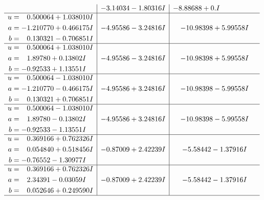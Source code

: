 \documentclass[1p]{elsarticle_modified}
\theoremstyle{definition}
\begin{document}
$$\begin{array}{c|c|c}
 & -3.14034 - 1.80316 I & -8.88688 + 0. I\phantom{ +0.000000I} \\ \hline\begin{aligned}
u &= \phantom{-}0.500064 + 1.038010 I \\
a &= -1.210770 + 0.466175 I \\
b &= \phantom{-}0.130321 - 0.706851 I\end{aligned}
 & -4.95586 - 3.24816 I & -10.98398 + 5.99558 I \\ \hline\begin{aligned}
u &= \phantom{-}0.500064 + 1.038010 I \\
a &= \phantom{-}1.89780 + 0.13802 I \\
b &= -0.92533 + 1.13551 I\end{aligned}
 & -4.95586 - 3.24816 I & -10.98398 + 5.99558 I \\ \hline\begin{aligned}
u &= \phantom{-}0.500064 - 1.038010 I \\
a &= -1.210770 - 0.466175 I \\
b &= \phantom{-}0.130321 + 0.706851 I\end{aligned}
 & -4.95586 + 3.24816 I & -10.98398 - 5.99558 I \\ \hline\begin{aligned}
u &= \phantom{-}0.500064 - 1.038010 I \\
a &= \phantom{-}1.89780 - 0.13802 I \\
b &= -0.92533 - 1.13551 I\end{aligned}
 & -4.95586 + 3.24816 I & -10.98398 - 5.99558 I \\ \hline\begin{aligned}
u &= \phantom{-}0.369166 + 0.762326 I \\
a &= \phantom{-}0.054840 + 0.518456 I \\
b &= -0.76552 - 1.30977 I\end{aligned}
 & -0.87009 + 2.42239 I & -5.58442 - 1.37916 I \\ \hline\begin{aligned}
u &= \phantom{-}0.369166 + 0.762326 I \\
a &= \phantom{-}2.34391 - 0.03059 I \\
b &= \phantom{-}0.052646 + 0.249590 I\end{aligned}
 & -0.87009 + 2.42239 I & -5.58442 - 1.37916 I\\
 \hline 
 \end{array}$$\newpage$$\begin{array}{c|c|c}  

\end{array}$$
\end{document}
